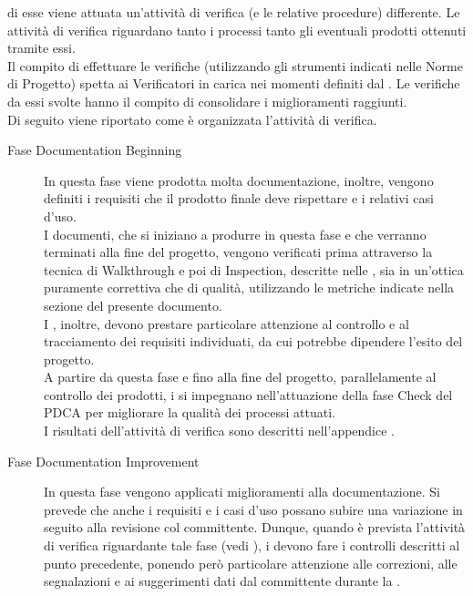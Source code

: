		di esse viene attuata un'attività di verifica (e le relative procedure) differente. Le attività di verifica riguardano tanto i processi tanto gli 
		eventuali prodotti ottenuti tramite essi.\\
		Il compito di effettuare le verifiche (utilizzando gli strumenti indicati nelle Norme di Progetto) spetta ai Verificatori in carica nei momenti 
		definiti dal . Le verifiche da essi svolte hanno il compito di consolidare i miglioramenti raggiunti.\\
		Di seguito viene riportato come è organizzata l'attività di verifica.
		\begin{description}
			\item[Fase Documentation Beginning] In questa fase viene prodotta molta documentazione, inoltre, vengono definiti i requisiti che il prodotto finale deve rispettare e i relativi casi d'uso. \\
		I documenti, che si iniziano a produrre in questa fase e che verranno terminati alla fine del progetto, vengono verificati prima attraverso la tecnica di Walkthrough e poi di Inspection, descritte nelle , sia in un'ottica puramente correttiva che di qualità, utilizzando le metriche indicate nella sezione  del presente documento. \\
		I , inoltre, devono prestare particolare attenzione al controllo e al tracciamento dei requisiti individuati, da cui potrebbe dipendere l'esito del progetto.\\
		A partire da questa fase e fino alla fine del progetto, parallelamente al controllo dei prodotti, i  si impegnano nell'attuazione della fase Check del PDCA per migliorare la qualità dei processi attuati. \\
		I risultati dell'attività di verifica sono descritti nell'appendice .
		\item[Fase Documentation Improvement] In questa fase vengono applicati miglioramenti alla documentazione. Si prevede che anche i requisiti e i casi d'uso 
		possano subire una variazione in seguito alla revisione col committente. Dunque, quando è prevista l'attività di verifica riguardante tale fase (vedi ), i  devono fare i controlli descritti al punto precedente, ponendo però particolare attenzione alle correzioni, alle segnalazioni e ai suggerimenti dati dal committente durante la .\\

\end{description}
